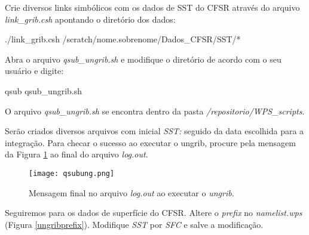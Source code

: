 \noindent Crie diversos links simbólicos com os dados de SST do CFSR através do arquivo \textit{link\_grib.csh} apontando o diretório dos dados:
\bigskip

\begin{bashcode}
./link_grib.csh /scratch/nome.sobrenome/Dados_CFSR/SST/*
\end{bashcode}
\bigskip

\noindent Abra o arquivo \textit{qsub\_ungrib.sh} e modifique o diretório de acordo com o seu usuário e  digite:
\bigskip

\begin{bashcode}
qsub qsub_ungrib.sh
\end{bashcode}
\bigskip

\begin{tcolorbox}[enhanced,
  grow to left by=0cm,%
  grow to right by=0cm,%
  enlarge top by=0cm,%
  enlarge bottom by=0cm,%
  tcbox raise base,
  boxrule=1.0pt,
  left=18mm,
  colframe=red!50!black,coltext=red!25!black,colback=red!10!white,
  overlay={\begin{tcbclipinterior}\fill[red!75!blue!50!white] (frame.south west)
    rectangle node[text=white,font=\sffamily\bfseries\footnotesize,rotate=0] {ATENÇÃO} ([xshift=18mm]frame.north west);\end{tcbclipinterior}}]
O arquivo \textit{qsub\_ungrib.sh} se encontra dentro da pasta \textit{/repositorio/WPS\_scripts}.
\end{tcolorbox}
\bigskip

\noindent Serão criados diversos arquivos com inicial \textit{SST:} seguido da data escolhida para a integração. Para checar o sucesso ao executar o ungrib, procure pela mensagem da Figura \textcolor{bleu_cite}{\ref{ungribsucess}} ao final do arquivo \textit{log.out}.
\bigskip

\begin{figure}[H]
    \centering
    \texttt{[image: qsubung.png]}
    \caption{Mensagem final no arquivo \textit{log.out} ao executar o \textit{ungrib}.}
    \label{ungribsucess}
\end{figure}
\bigskip

\noindent Seguiremos para os dados de superfície do CFSR. Altere o \textit{prefix} no \textit{namelist.wps} (Figura \textcolor{bleu_cite}{\ref{ungribprefix}}). Modifique \textit{SST} por \textit{SFC} e salve a modificação.
\bigskip

